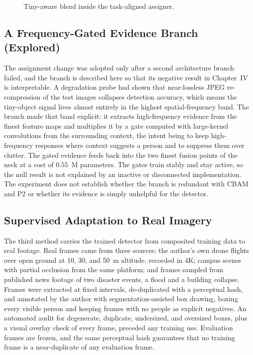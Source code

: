 \begin{figure}[tbp]
  \centering
  \caption{Tiny-aware blend inside the task-aligned assigner.}
  \label{fig:assignmech}
\end{figure}

\subsection{A Frequency-Gated Evidence Branch (Explored)}
\label{sec:fccgmethod}
The assignment change was adopted only after a second architecture branch
failed, and the branch is described here so that its negative result in
Chapter~IV is interpretable. A degradation probe had shown that near-lossless
JPEG re-compression of the test images collapses detection accuracy, which
means the tiny-object signal lives almost entirely in the highest
spatial-frequency band. The branch made that band explicit: it extracts
high-frequency evidence from the finest feature maps and multiplies it by a
gate computed with large-kernel convolutions from the surrounding context, the
intent being to keep high-frequency responses where context suggests a person
and to suppress them over clutter. The gated evidence feeds back into the two
finest fusion points of the neck at a cost of $0.55$~M parameters. The gates
train stably and stay active, so the null result is not explained by an
inactive or disconnected implementation. The experiment does not establish
whether the branch is redundant with CBAM and P2 or whether its evidence is
simply unhelpful for the detector.

\subsection{Supervised Adaptation to Real Imagery}
\label{sec:adaptmethod}
The third method carries the trained detector from composited training data to
real footage. Real frames came from three sources: the author's own drone
flights over open ground at 10, 30, and 50~m altitude, recorded in 4K; campus
scenes with partial occlusion from the same platform; and frames sampled from
published news footage of two disaster events, a flood and a building
collapse. Frames were extracted at fixed intervals, de-duplicated with a
perceptual hash, and annotated by the author with segmentation-assisted box
drawing, boxing every visible person and keeping frames with no people as
explicit negatives. An automated audit for degenerate, duplicate, undersized,
and oversized boxes, plus a visual overlay check of every frame, preceded any
training use. Evaluation frames are frozen, and the same perceptual hash
guarantees that no training frame is a near-duplicate of any evaluation frame.

